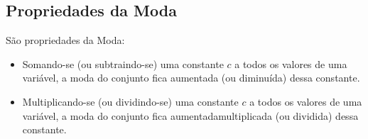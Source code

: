     \subsection{Propriedades da Moda}

São propriedades da Moda:
\begin{itemize}
    \item Somando-se (ou subtraindo-se) uma constante $c$ a todos os valores de uma variável, a moda do conjunto fica aumentada (ou diminuída) dessa constante.
    \item Multiplicando-se (ou dividindo-se) uma constante $c$ a todos os valores de uma variável, a moda do conjunto fica aumentadamultiplicada (ou dividida) dessa constante.
\end{itemize}
